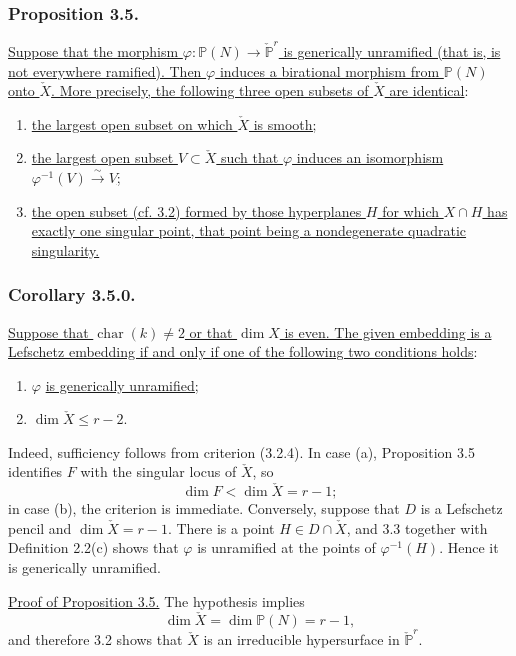 \subsubsection*{Proposition 3.5.}
\underline{Suppose that the morphism
$\varphi:\mathbb P(N)\to\check{\mathbb P}^{r}$ is generically
unramified (that is, is not everywhere ramified).  Then $\varphi$
induces a birational morphism from $\mathbb P(N)$ onto $\check X$.
More precisely, the following three open subsets of $\check X$ are
identical}:
\begin{enumerate}
\item[(a)] \underline{the largest open subset on which $\check X$ is
smooth;}
\item[(b)] \underline{the largest open subset $V\subset\check X$ such
that $\varphi$ induces an isomorphism
$\varphi^{-1}(V)\xrightarrow{\sim}V$;}
\item[(c)] \underline{the open subset (cf. 3.2) formed by those
hyperplanes $H$ for which $X\cap H$ has exactly one singular point,
that point being a nondegenerate quadratic singularity.}
\end{enumerate}

\subsubsection*{Corollary 3.5.0.}
\underline{Suppose that $\operatorname{char}(k)\ne2$ or that $\dim X$
is even.  The given embedding is a Lefschetz embedding if and only if
one of the following two conditions holds}:
\begin{enumerate}
\item[(a)] $\varphi$ \underline{is generically unramified;}
\item[(b)] $\dim\check X\leq r-2$.
\end{enumerate}

Indeed, sufficiency follows from criterion (3.2.4).  In case (a),
Proposition 3.5 identifies $F$ with the singular locus of $\check X$,
so
\[
\dim F<\dim\check X=r-1;
\]
in case (b), the criterion is immediate.  Conversely, suppose that
$D$ is a Lefschetz pencil and $\dim\check X=r-1$.  There is a point
$H\in D\cap\check X$, and 3.3 together with Definition 2.2(c) shows
that $\varphi$ is unramified at the points of $\varphi^{-1}(H)$.
Hence it is generically unramified.

\noindent\underline{Proof of Proposition 3.5.}
The hypothesis implies
\[
\dim\check X=\dim\mathbb P(N)=r-1,
\]
and therefore 3.2 shows that $\check X$ is an irreducible hypersurface
in $\check{\mathbb P}^{r}$.

